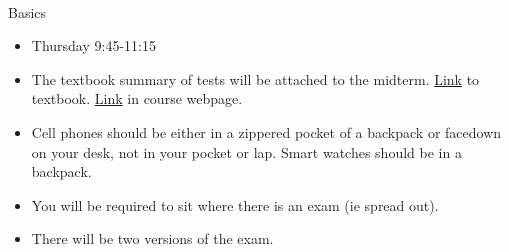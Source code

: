 \documentclass[11pt,fleqn]{article}
\begin{document}
\renewcommand{\headrulewidth}{0pt}
\newcommand{\blank}[1]{\rule{#1}{0.75pt}}
\newcommand{\bc}{\begin{center}}
\newcommand{\ec}{\end{center}}
\renewcommand{\d}{\displaystyle}

\vspace*{-0.7in}

\begin{center}
  \large
  \\
   
\end{center}
{\Large{Basics}}\\

\begin{itemize}
\item Thursday 9:45-11:15
\item The textbook summary of tests will be attached to the midterm. \href{https://openstax.org/books/calculus-volume-2/pages/5-6-ratio-and-root-tests}{Link} to textbook. \href{https://uaf-math251.github.io/calc2/assets/worksheets/F23/convsummary.pdf}{Link} in course webpage.
\item Cell phones should be either in a zippered pocket of a backpack or facedown on your desk, not in your pocket or lap. Smart watches should be in a backpack.
\item You will be required to sit where there is an exam (ie spread out).
\item There will be two versions of the exam.\\
\end{itemize}

\\
\end{document}
